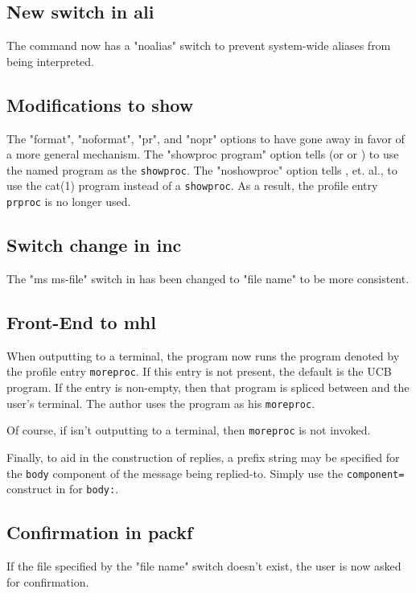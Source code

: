 \subsection*	{New switch in ali}
The  command now has a \switch"noalias" switch to prevent
system-wide aliases from being interpreted.

\subsection*	{Modifications to show}
The \switch"format", \switch"noformat", \switch"pr", and \switch"nopr"
options to  have gone away in favor of a more general mechanism.
The \switch"showproc program" option tells 
(or  or ) to use the named program as the \verb"showproc".
The \switch"noshowproc" option tells , et. al.,
to use the \man cat(1) program instead of a \verb"showproc".
As a result, the profile entry \verb"prproc" is no longer used.

\subsection*	{Switch change in inc}
The \switch"ms ms-file" switch in  has been changed to
\switch"file name" to be more consistent.

\subsection*	{Front-End to mhl}
When outputting to a terminal,
the  program now runs the program denoted by the profile entry
\verb"moreproc".
If this entry is not present,
the default is the UCB  program.
If the entry is non-empty,
then that program is spliced between  and the user's terminal.
The author uses the  program as his \verb"moreproc".

Of course,
if  isn't outputting to a terminal,
then \verb"moreproc" is not invoked.

Finally,
to aid in the construction of replies,
a prefix string may be specified for the \verb"body" component of the message
being replied-to.
Simply use the \verb"component=" construct in  for \verb"body:".

\subsection*	{Confirmation in packf}
If the file specified by the \switch"file name" switch doesn't exist,
the user is now asked for confirmation.

